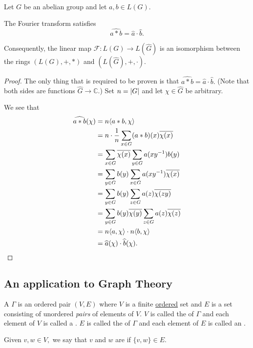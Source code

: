 \begin{thm} \label{thm:fourierisorings}
    Let $G$ be an abelian group and let $a, b \in L(G).$

    The Fourier transform satisfies
    \begin{equation*}
        \widehat{a * b} = \widehat{a} \cdot \widehat{b}.
    \end{equation*}
    
    Consequently, the linear map $\mathcal{F} : L(G) \to L(\widehat{G})$ is an isomorphism between the rings $(L(G), +, *)$ and $(L(\widehat{G}), +, \cdot).$
\end{thm}
\begin{proof}
    The only thing that is required to be proven is that $\widehat{a * b} = \widehat{a} \cdot \widehat{b}.$ (Note that both sides are functions $\widehat{G} \to \mathbb{C}.$) Set $n = {\left\lvert G \right\lvert}$ and let $\chi \in \widehat{G}$ be arbitrary.
    
    We see that
    \begin{align*}
        \widehat{a * b}(\chi) &= n \langle a * b, \chi\rangle \\
        &= n \cdot \frac{1}{n} \sum_{x \in G} (a * b)(x) \overline{\chi(x)} \\
        &= \sum_{x \in G}\overline{\chi(x)} \sum_{y \in G} a(xy^{-1})b(y) \\
        &= \sum_{y \in G}b(y) \sum_{x \in G}a(xy^{-1})\overline{\chi(x)} \\
        &= \sum_{y \in G}b(y) \sum_{z \in G}a(z)\overline{\chi(zy)} \\
        &= \sum_{y \in G}b(y)\overline{\chi(y)} \sum_{z \in G}a(z)\overline{\chi(z)} \\
        &= n\langle a, \chi\rangle \cdot n\langle b, \chi\rangle \\
        &= \widehat{a}(\chi) \cdot \widehat{b}(\chi). \qedhere
    \end{align*}
\end{proof}

\subsection{An application to Graph Theory}

\begin{defn}%
    A  $\Gamma$ is an ordered pair $(V, E)$ where $V$ is a finite \underline{ordered} set and $E$ is a set consisting of unordered \emph{pairs} of elements of $V.$ $V$ is called the  of $\Gamma$ and each element of $V$ is called a . $E$ is called the  of $\Gamma$ and each element of $E$ is called an .

    Given $v, w \in V,$ we say that $v$ and $w$ are  if $\{v, w\} \in E.$
\end{defn}

